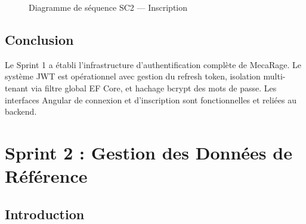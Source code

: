 \documentclass[12pt,a4paper]{report}
\begin{document}
\begin{figure}[H]
\centering
{}%
\caption{Diagramme de séquence SC2 — Inscription}
\label{fig:seq-register}
\end{figure}

\section{Conclusion}

Le Sprint 1 a établi l'infrastructure d'authentification complète de MecaRage.
Le système JWT est opérationnel avec gestion du refresh token, isolation multi-tenant
via filtre global EF Core, et hachage bcrypt des mots de passe. Les interfaces
Angular de connexion et d'inscription sont fonctionnelles et reliées au backend.

\chapter{Sprint 2 : Gestion des Données de Référence}

\section{Introduction}
\end{document}
